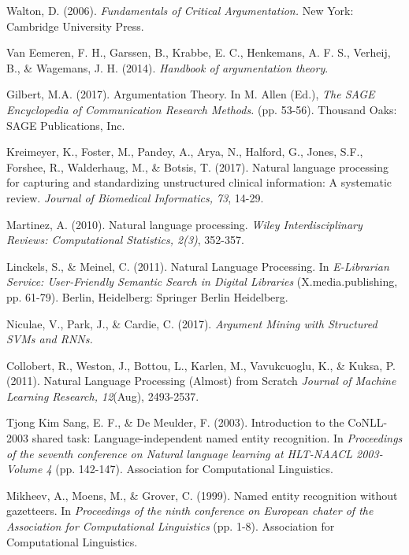 \documentclass[12pt,a4paper]{article}
\begin{document}
\newpage
\begin{thebibliography}{9}

  Walton, D. (2006).
  \textit{Fundamentals of Critical Argumentation.}
  New York: Cambridge University Press.
  
  Van Eemeren, F. H., Garssen, B., Krabbe, E. C., Henkemans, A. F. S., Verheij, B., \& Wagemans, J. H. (2014). \textit{Handbook of argumentation theory}.

  Gilbert, M.A. (2017).
  Argumentation Theory. In M. Allen (Ed.), \textit{The SAGE Encyclopedia of Communication Research Methods.} (pp. 53-56). Thousand Oaks: SAGE Publications, Inc.

  Kreimeyer, K., Foster, M., Pandey, A., Arya, N., Halford, G., Jones, S.F., Forshee, R., Walderhaug, M., \& Botsis, T. (2017).
  Natural language processing for capturing and standardizing unstructured clinical information: A systematic review. \textit{Journal of Biomedical Informatics, 73}, 14-29.
  
  Martinez, A. (2010).
  Natural language processing. \textit{Wiley Interdisciplinary Reviews: Computational Statistics, 2(3)}, 352-357.

  Linckels, S., \& Meinel, C. (2011).
  Natural Language Processing. In \textit{E-Librarian Service: User-Friendly Semantic Search in Digital Libraries} (X.media.publishing, pp. 61-79). Berlin, Heidelberg: Springer Berlin Heidelberg.
  
  Niculae, V., Park, J., \& Cardie, C. (2017). \textit{Argument Mining with Structured SVMs and RNNs.}
  
  Collobert, R., Weston, J., Bottou, L., Karlen, M., Vavukcuoglu, K., \& Kuksa, P. (2011).
  Natural Language Processing (Almost) from Scratch \textit{Journal of Machine Learning Research, 12}(Aug), 2493-2537.

  Tjong Kim Sang, E. F., \& De Meulder, F. (2003). Introduction to the CoNLL-2003 shared task: Language-independent named entity recognition. In \textit{Proceedings of the seventh conference on Natural language learning at HLT-NAACL 2003-Volume 4} (pp. 142-147). Association for Computational Linguistics.
  
  Mikheev, A., Moens, M., \& Grover, C. (1999). Named entity recognition without gazetteers. In \textit{Proceedings of the ninth conference on European chater of the Association for Computational Linguistics} (pp. 1-8). Association for Computational Linguistics.
  

\end{thebibliography}
\end{document}
